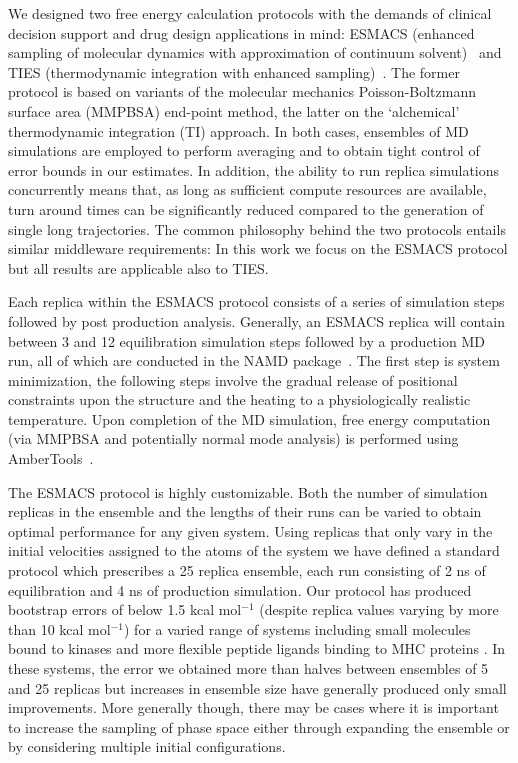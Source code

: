 \documentclass[conference]{IEEEtran}
\begin{document}
%
%
%
%
%


%
%

We designed two free energy calculation protocols with the demands of clinical
decision support and drug design applications in mind: ESMACS (enhanced
sampling of molecular dynamics with approximation of continuum
solvent)~\cite{Wan2017brd4} and TIES (thermodynamic integration with enhanced
sampling)~\cite{Bhati2017}. The former protocol is based on variants of the
molecular mechanics Poisson-Boltzmann surface area (MMPBSA) end-point method,
the latter on the `alchemical' thermodynamic integration (TI) approach. In
both cases, ensembles of MD simulations are employed to perform averaging and
to obtain tight control of error bounds in our estimates. In addition, the
ability to run replica simulations concurrently means that, as long as
sufficient compute resources are available, turn around times can be
significantly reduced compared to the generation of single long trajectories.
The common philosophy behind the two protocols entails similar middleware
requirements: In this work we focus on the ESMACS protocol but all results are
applicable also to TIES.

Each replica within the ESMACS protocol consists of a series of simulation
steps followed by post production analysis. Generally, an ESMACS replica will
contain between 3 and 12 equilibration simulation steps followed by a
production MD run, all of which are conducted in the NAMD
package~\cite{Phillips2005}. The first step is system minimization, the
following steps involve the gradual release of positional constraints upon
the structure and the heating to a physiologically realistic temperature.
Upon completion of the MD simulation, free energy computation (via MMPBSA and
potentially normal mode analysis) is performed using
AmberTools~\cite{Case2005, MillerIII2012}.

The ESMACS protocol is highly customizable. Both the number of simulation replicas in the ensemble and the lengths of their runs can be varied to
obtain optimal performance for any given system. Using replicas that only
vary in the initial velocities assigned to the atoms of the system we have
defined a standard protocol which prescribes a 25 replica ensemble, each run
consisting of 2 ns of equilibration and 4 ns of production simulation. Our
protocol has produced bootstrap errors of below 1.5 kcal mol$^{-1}$ (despite
replica values varying by more than 10 kcal mol$^{-1}$) for a varied range of
systems including small molecules bound to kinases and more flexible peptide
ligands binding to MHC proteins \cite{Wan2015, Wright2014, Wan2017brd4}.
In these systems, the error we obtained more than halves between ensembles of
5 and 25 replicas but increases in ensemble size have generally produced only
small improvements. More generally though, there may be cases where it is
important to increase the sampling of phase space either through expanding
the ensemble or by considering multiple initial configurations.
\end{document}
